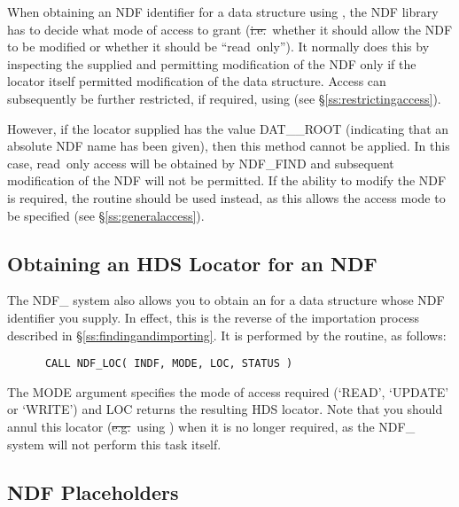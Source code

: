 When obtaining an NDF identifier for a data structure using ,
the NDF library has to decide what mode of access to grant
(\st{i.e.}\ whether it should allow the NDF to be modified or whether it  
should be ``read~only''). It normally does this by inspecting the
 supplied and permitting
modification of the NDF only if the
locator itself permitted modification of the data structure. Access
can subsequently be further restricted, if required, using 
(see \S\ref{ss:restrictingaccess}).

However, if the locator supplied has the value DAT\_\_ROOT (indicating
that an absolute NDF name has been given), then this method cannot be
applied. In this case, read~only access will be obtained by NDF\_FIND
and subsequent modification of the NDF will not be permitted. If the
ability to modify the NDF is required, the routine  should be
used instead, as this allows the access mode to be specified (see
\S\ref{ss:generalaccess}).

\subsection{\label{ss:gettingalocator}Obtaining an HDS Locator for an NDF}

The NDF\_ system also allows you to obtain an  for a data structure whose NDF
identifier you supply. In effect, this is the reverse of the
importation process described in \S\ref{ss:findingandimporting}. It is
performed by the  routine, as follows:

\small
\begin{verbatim}
      CALL NDF_LOC( INDF, MODE, LOC, STATUS )
\end{verbatim}
\normalsize

The MODE argument specifies the mode of access required (`READ', `UPDATE' or
`WRITE') and LOC returns the resulting HDS locator. Note that you should annul
this locator (\st{e.g.}\ using )
when it is no longer required, as the NDF\_ system will not perform
this task itself.

\subsection{\label{ss:placeholders}NDF Placeholders}

